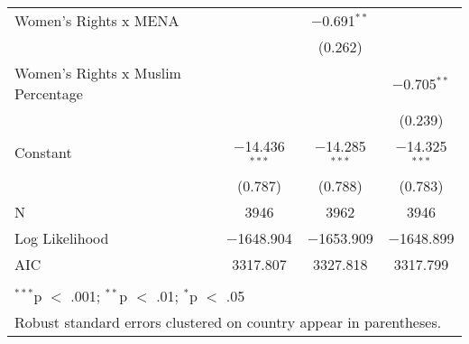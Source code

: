 \begin{table}[!htbp]
\begin{tabular}{@{\extracolsep{5pt}}lccc}
  Women's Rights x MENA &  & $-$0.691$^{**}$ &  \\ 
  &  & (0.262) &  \\ 
  Women's Rights x Muslim Percentage &  &  & $-$0.705$^{**}$ \\ 
  &  &  & (0.239) \\ 
  Constant & $-$14.436$^{***}$ & $-$14.285$^{***}$ & $-$14.325$^{***}$ \\ 
  & (0.787) & (0.788) & (0.783) \\ 
 N & 3946 & 3962 & 3946 \\ 
Log Likelihood & $-$1648.904 & $-$1653.909 & $-$1648.899 \\ 
AIC & 3317.807 & 3327.818 & 3317.799 \\ 
\hline \\[-1.8ex] 
\multicolumn{4}{l}{$^{***}$p $<$ .001; $^{**}$p $<$ .01; $^{*}$p $<$ .05} \\ 
\multicolumn{4}{l}{Robust standard errors clustered on country appear in parentheses.} \\ 
\end{tabular} 
\end{table} 
